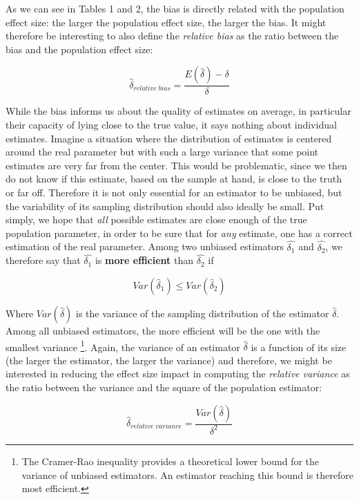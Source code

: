\documentclass[
  man,floatsintext]{apa6}
\begin{document}
As we can see in Tables 1 and 2, the bias is directly related with the population effect size: the larger the population effect size, the larger the bias. It might therefore be interesting to also define the \emph{relative bias} as the ratio between the bias and the population effect size:

\begin{equation} 
\hat{\delta}_{relative \; bias}=\frac{E(\hat{\delta})-\delta}{\delta}
\label{eq:RELBIAS}
\end{equation}

While the bias informs us about the quality of estimates on average, in particular their capacity of lying close to the true value, it says nothing about individual estimates. Imagine a situation where the distribution of estimates is centered around the real parameter but with such a large variance that some point estimates are very far from the center. This would be problematic, since we then do not know if this estimate, based on the sample at hand, is close to the truth or far off. Therefore it is not only essential for an estimator to be unbiased, but the variability of its sampling distribution should also ideally be small. Put simply, we hope that \emph{all} possible estimates are close enough of the true population parameter, in order to be sure that for \emph{any} estimate, one has a correct estimation of the real parameter. Among two unbiased estimators \(\hat{\delta_1}\) and \(\hat{\delta_2}\), we therefore say that \(\hat{\delta_1}\) is \textbf{more efficient} than \(\hat{\delta_2}\) if

\begin{equation} 
Var(\hat{\delta}_1) \leq Var(\hat{\delta}_2)
\label{eq:EFFICIENCY}
\end{equation}

Where \(Var(\hat{\delta})\) is the variance of the sampling distribution of the estimator \(\hat{\delta}\). Among all unbiased estimators, the more efficient will be the one with the smallest variance \footnote{The Cramer-Rao inequality provides a theoretical lower bound for the variance of unbiased estimators. An estimator reaching this bound is therefore most efficient.}. Again, the variance of an estimator \(\hat{\delta}\) is a function of its size (the larger the estimator, the larger the variance) and therefore, we might be interested in reducing the effect size impact in computing the \emph{relative variance} as the ratio between the variance and the square of the population estimator:

\begin{equation} 
\hat{\delta}_{relative \; variance}=\frac{Var(\hat{\delta})}{\delta^2}
\label{eq:RELVAR}
\end{equation}
\end{document}

